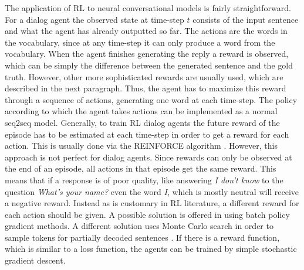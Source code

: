 \documentclass[12pt]{article}
\begin{document}
The application of RL to neural conversational models is fairly straightforward. For a dialog agent the observed state at time-step \(t\) consists of the input sentence and what the agent has already outputted so far. The actions are the words in the vocabulary, since at any time-step it can only produce a word from the vocabulary. When the agent finishes generating the reply a reward is observed, which can be simply the difference between the generated sentence and the gold truth. However, other more sophisticated rewards are usually used, which are described in the next paragraph. Thus, the agent has to maximize this reward through a sequence of actions, generating one word at each time-step. The policy according to which the agent takes actions can be implemented as a normal seq2seq model. Generally, to train RL dialog agents the future reward of the episode has to be estimated at each time-step in order to get a reward for each action. This is usually done via the REINFORCE algorithm \cite{Williams:1992}. However, this approach is not perfect for dialog agents. Since rewards can only be observed at the end of an episode, all actions in that episode get the same reward. This means that if a response is of poor quality, like answering \textit{I don't know} to the question \textit{What's your name?} even the word \textit{I}, which is mostly neutral will receive a negative reward.  Instead as is customary in RL literature, a different reward for each action should be given. A possible solution is offered in \cite{Kandasamy:2017} using batch policy gradient methods. A different solution uses Monte Carlo search in order to sample tokens for partially decoded sentences \cite{Li_adversarial:2017}. If there is a reward function, which is similar to a loss function, the agents can be trained by simple stochastic gradient descent.
\end{document}
